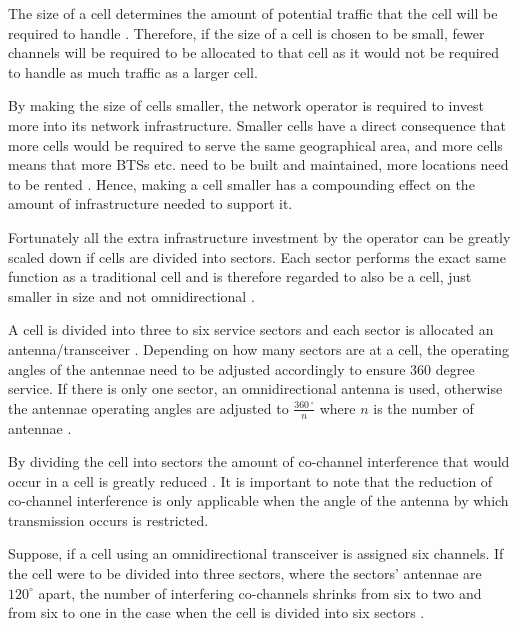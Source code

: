 The size of a cell determines the amount of potential traffic that the cell will be required to handle \cite{GSM92,Eisenblatter,GSMArchitectureProtocolsServices}. Therefore, if the size of a cell is chosen to be small, fewer channels will be required to be allocated to that cell as it would not be required to handle as much traffic as a larger cell. 

By making the size of cells smaller, the network operator is required to invest more into its network infrastructure. Smaller cells have a direct consequence that more cells would be required to serve the same geographical area, and more cells means that more BTSs etc. need to be built and maintained, more locations need to be rented \cite{GSMArchitectureProtocolsServices}. Hence, making a cell smaller has a compounding effect on the amount of infrastructure needed to support it.

Fortunately all the extra infrastructure investment by the operator can be greatly scaled down if cells are divided into sectors\label{def:cellsector}. Each sector performs the exact same function as a traditional cell and is therefore regarded to also be a cell, just smaller in size and not omnidirectional \cite{GSMArchitectureProtocolsServices,GSM92,GSMSysEngin}. 

A cell is divided into three to six service sectors and each sector is allocated an antenna/transceiver \cite{GSMSysEngin}. Depending on how many sectors are at a cell, the operating angles of the antennae need to be adjusted accordingly to ensure 360 degree service. If there is only one sector, an omnidirectional antenna is used, otherwise the antennae operating angles are adjusted to $\frac{360\,^{\circ}}{n}$ where ${n}$ is the number of antennae \cite{Eisenblatter}.

By dividing the cell into sectors the amount of co-channel interference that would occur in a cell is greatly reduced \cite{GSMArchitectureProtocolsServices}. It is important to note that the reduction of co-channel interference is only applicable when the angle of the antenna by which transmission occurs is restricted\cite{GSMArchitectureProtocolsServices}.

Suppose, if a cell using an omnidirectional transceiver is assigned six channels. If the cell were to be divided into three sectors, where the sectors' antennae are $120^\circ$ apart, the number of interfering co-channels shrinks from six to two and from six to one in the case when the cell is divided into six sectors \cite{GSMSysEngin,GSM92,GSMArchitectureProtocolsServices}.

